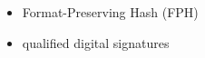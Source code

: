 \begin{itemize}
	
	\item Format-Preserving Hash (FPH)
	
	
	
	\item qualified digital signatures

\end{itemize}
